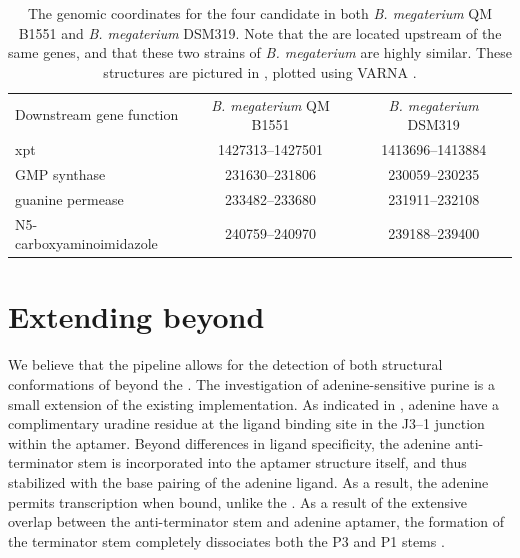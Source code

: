 \begin{table}[!ht]
\centering
\begin{tabularx}{\linewidth}{*{1}{L} *{2}{C}}
\toprule
\small{Downstream gene function} & \small{{\em B. megaterium} QM B1551} & \small{{\em B. megaterium} DSM319} \\
\cmidrule(lr){1-3}
\small{xpt} & 1427313--1427501 & 1413696--1413884 \\[1ex]
\small{GMP synthase} & 231630--231806 & 230059--230235 \\[1ex]
\small{guanine permease} & 233482--233680 & 231911--232108 \\[1ex]
\small{N5-carboxyaminoimidazole} & 240759--240970 & 239188--239400 \\
\bottomrule
\end{tabularx}
\caption[The genomic coordinates for the four candidate \grbs in both
{\em B. megaterium} QM B1551 and {\em B. megaterium} DSM319]{The genomic coordinates for the four candidate \grbs in both
{\em B. megaterium} QM B1551 and {\em B. megaterium} DSM319. Note that the
\grbs are located upstream of the same genes, and that these two strains of
{\em B. megaterium} are highly similar. These structures are pictured in
, plotted using VARNA \citep{darty:2009gt}.}
\label{table:rfinderCandidateLocs}
\end{table}

\section{Extending beyond \grbs}
\label{sec:rfinder:ext}

We believe that the \rfinder pipeline allows for the detection of both structural
conformations of \rbs beyond the \grb. The investigation of
adenine-sensitive purine \rbs is a small extension of the existing
implementation. As indicated in , adenine
\rbs have a complimentary uradine residue at the ligand binding site in
the J3--1 junction within the aptamer. Beyond differences in ligand specificity,
the adenine \rb anti-terminator stem is incorporated into the aptamer structure
itself, and thus stabilized with the base pairing of the adenine ligand. As a
result, the adenine \rb permits transcription when bound, unlike the \grb.
As a result of the extensive overlap between the anti-terminator stem and adenine
\rb aptamer, the formation of the terminator stem completely dissociates both the
P3 and P1 stems \citep{mandal2004a}.

